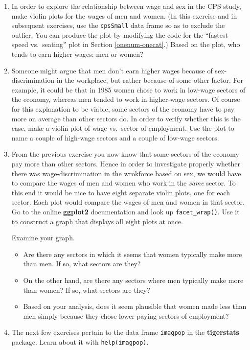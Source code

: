 \documentclass[]{book}
\providecommand{\tightlist}{%
  \setlength{\itemsep}{0pt}\setlength{\parskip}{0pt}}
\theoremstyle{definition}
\theoremstyle{definition}
\theoremstyle{remark}
\begin{document}
{\begin{enumerate}
  Create a new data frame called \texttt{cpsSmall} that is the same as
  \texttt{CPC85} execept that it excludes the row corresponding to the
  outlier-individual.
\item
  In order to explore the relationship between wage and sex in the CPS
  study, make violin plots for the wages of men and women. (In this
  exercise and in subsequent exercises, use the \texttt{cpsSmall} data
  frame so as to exclude the outlier. You can produce the plot by
  modifying the code for the ``fastest speed vs.~seating'' plot in
  Section \ref{onenum-onecat}.) Based on the plot, who tends to earn
  higher wages: men or women?
\item
  Someone might argue that men don't earn higher wages because of
  sex-discrimination in the workplace, but rather because of some other
  factor. For example, it could be that in 1985 women chose to work in
  low-wage sectors of the economy, whereas men tended to work in
  higher-wage sectors. Of course for this explanation to be viable, some
  sectors of the economy have to pay more on average than other sectors
  do. In order to verify whether this is the case, make a violin plot of
  wage vs.~sector of employment. Use the plot to name a couple of
  high-wage sectors and a couple of low-wage sectors.
\item
  From the previous exercise you now know that some sectors of the
  economy pay more than other sectors. Hence in order to investigate
  properly whether there was wage-discrimination in the wrokforce based
  on sex, we would have to compare the wages of men and women who work
  in the \emph{same} sector. To this end it would be nice to have eight
  separate violin plots, one for each sector. Each plot would compare
  the wages of men and women in that sector. Go to the online
  \textbf{ggplot2} documentation and look up \texttt{facet\_wrap()}. Use
  it to construct a graph that displays all eight plots at once.

  Examine your graph.

  \begin{itemize}
  \tightlist
  \item
    Are there any sectors in which it seems that women typically make
    more than men. If so, what sectors are they?
  \item
    On the other hand, are there any sectors where men typically make
    more than women? If so, what sectors are they?
  \item
    Based on your analysis, does it seem plausible that women made less
    than men simply because they chose lower-paying sectors of
    employment?
  \end{itemize}
\item
  The next few exercises pertain to the data frame \texttt{imagpop} in
  the \textbf{tigerstats} package. Learn about it with
  \texttt{help(imagpop)}.


\end{enumerate}}
\end{document}
